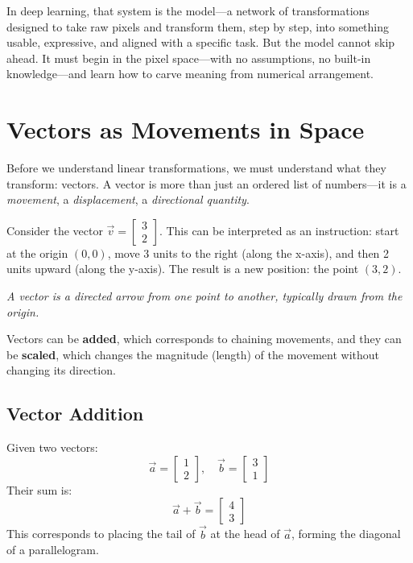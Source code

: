 In deep learning, that system is the model—a network of transformations designed to take raw pixels and transform them, step by step, into something usable, expressive, and aligned with a specific task. But the model cannot skip ahead. It must begin in the pixel space—with no assumptions, no built-in knowledge—and learn how to carve meaning from numerical arrangement.

\section{Vectors as Movements in Space}

Before we understand linear transformations, we must understand what they transform: vectors. A vector is more than just an ordered list of numbers—it is a \textit{movement}, a \textit{displacement}, a \textit{directional quantity}.

Consider the vector \( \vec{v} = \begin{bmatrix} 3 \\ 2 \end{bmatrix} \). This can be interpreted as an instruction: start at the origin \( (0, 0) \), move 3 units to the right (along the x-axis), and then 2 units upward (along the y-axis). The result is a new position: the point \( (3, 2) \).

\begin{center}
	\textit{A vector is a directed arrow from one point to another, typically drawn from the origin.}
\end{center}

Vectors can be \textbf{added}, which corresponds to chaining movements, and they can be \textbf{scaled}, which changes the magnitude (length) of the movement without changing its direction.

\subsection*{Vector Addition}
Given two vectors:
\[
\vec{a} = \begin{bmatrix} 1 \\ 2 \end{bmatrix}, \quad
\vec{b} = \begin{bmatrix} 3 \\ 1 \end{bmatrix}
\]
Their sum is:
\[
\vec{a} + \vec{b} = \begin{bmatrix} 4 \\ 3 \end{bmatrix}
\]
This corresponds to placing the tail of \( \vec{b} \) at the head of \( \vec{a} \), forming the diagonal of a parallelogram.

